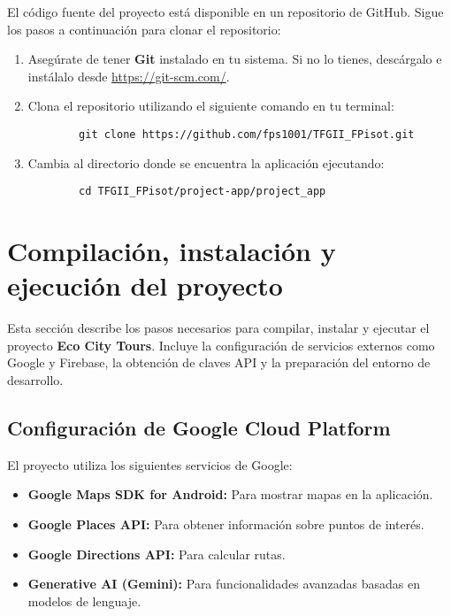 El código fuente del proyecto está disponible en un repositorio de GitHub. Sigue los pasos a continuación para clonar el repositorio:

\begin{enumerate}
	\item Asegúrate de tener \textbf{Git} instalado en tu sistema. Si no lo tienes, descárgalo e instálalo desde \url{https://git-scm.com/}.
	
	\item Clona el repositorio utilizando el siguiente comando en tu terminal:
	\begin{verbatim}
		git clone https://github.com/fps1001/TFGII_FPisot.git
	\end{verbatim}
	
	\item Cambia al directorio donde se encuentra la aplicación ejecutando:
	\begin{verbatim}
		cd TFGII_FPisot/project-app/project_app
	\end{verbatim}
	
\end{enumerate}




\section{Compilación, instalación y ejecución del proyecto} \label{sec:compilacion}

Esta sección describe los pasos necesarios para compilar, instalar y ejecutar el proyecto \textbf{Eco City Tours}. Incluye la configuración de servicios externos como Google y Firebase, la obtención de claves API y la preparación del entorno de desarrollo.

\subsection{Configuración de Google Cloud Platform}

El proyecto utiliza los siguientes servicios de Google:
\begin{itemize}
	\item \textbf{Google Maps SDK for Android:} Para mostrar mapas en la aplicación.
	\item \textbf{Google Places API:} Para obtener información sobre puntos de interés.
	\item \textbf{Google Directions API:} Para calcular rutas.
	\item \textbf{Generative AI (Gemini):} Para funcionalidades avanzadas basadas en modelos de lenguaje.
\end{itemize}

